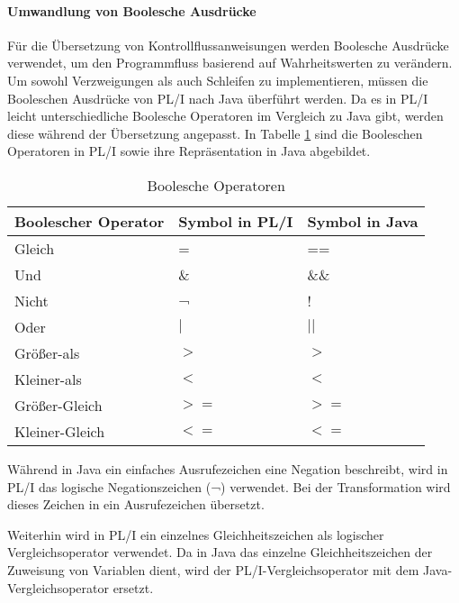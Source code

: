 \paragraph*{Umwandlung von Boolesche Ausdrücke}
Für die Übersetzung von Kontrollflussanweisungen werden Boolesche Ausdrücke verwendet, um den Programmfluss basierend auf Wahrheitswerten zu verändern. Um sowohl Verzweigungen als auch Schleifen zu implementieren, müssen die Booleschen Ausdrücke von PL/I nach Java überführt werden. Da es in PL/I leicht unterschiedliche Boolesche Operatoren im Vergleich zu Java gibt, werden diese während der Übersetzung angepasst. In Tabelle \ref{tab:booloperator} sind die Booleschen Operatoren in PL/I sowie ihre Repräsentation in Java abgebildet.


\begin{table}[h]
	\centering
	\begin{tabularx}{\textwidth}{|X|X|X|}
		\hline
		\textbf{Boolescher Operator} & \textbf{Symbol in PL/I} & \textbf{Symbol in Java}  \\
		\hline
		Gleich & = & ==  \\
		Und & \& & \&\& \\
		Nicht & ¬ & ! \\
		Oder & $\mid$ &	$\mid$$\mid$ \\
		Größer-als & $>$ & $>$ \\
		Kleiner-als & $<$ & $<$ \\
		Größer-Gleich & $>=$ & $>=$ \\
		Kleiner-Gleich & $<=$ & $<=$ \\
		\hline
		
	\end{tabularx}
	\caption{Boolesche Operatoren \label{tab:booloperator}}
\end{table}



Während in Java ein einfaches Ausrufezeichen eine Negation beschreibt, wird in PL/I das logische Negationszeichen (¬) verwendet. Bei der Transformation wird dieses Zeichen in ein Ausrufezeichen übersetzt.

Weiterhin wird in PL/I ein einzelnes Gleichheitszeichen als logischer Vergleichsoperator verwendet. Da in Java das einzelne Gleichheitszeichen der Zuweisung von Variablen dient, wird der PL/I-Vergleichsoperator mit dem Java-Vergleichsoperator ersetzt.

